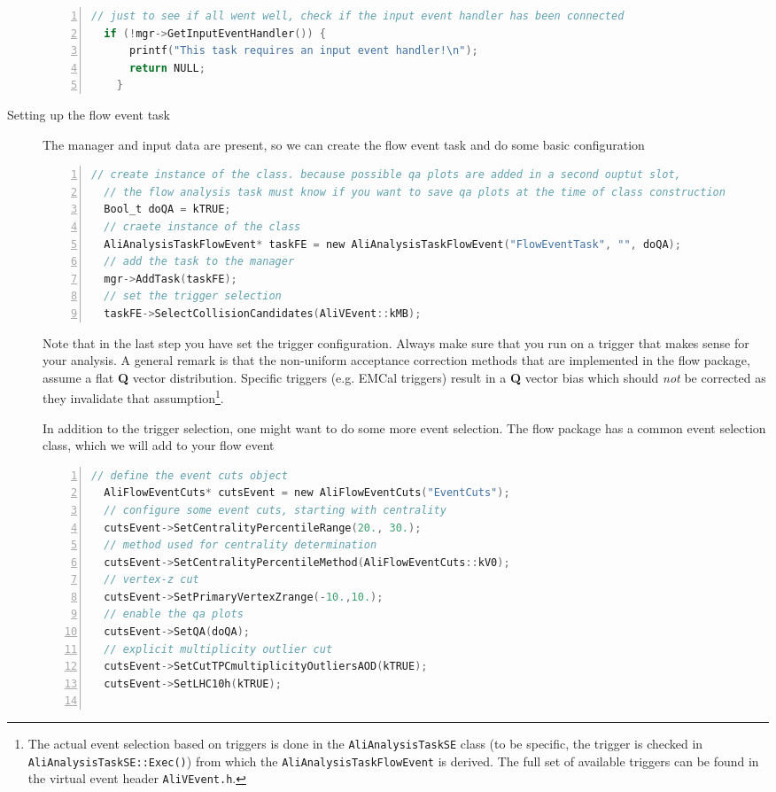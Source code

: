 \documentclass[a4paper]{book}
\numberwithin{equation}{subsection}
\begin{document}
\begin{description}
\begin{lstlisting}[language=C, numbers=left]
  // just to see if all went well, check if the input event handler has been connected
  if (!mgr->GetInputEventHandler()) {
      printf("This task requires an input event handler!\n");
      return NULL;
    }\end{lstlisting}
    \item [Setting up the flow event task]
The manager and input data are present, so we can create the flow event task and do some basic configuration
\begin{lstlisting}[language=C, numbers=left]
  // create instance of the class. because possible qa plots are added in a second ouptut slot,
  // the flow analysis task must know if you want to save qa plots at the time of class construction
  Bool_t doQA = kTRUE;
  // craete instance of the class
  AliAnalysisTaskFlowEvent* taskFE = new AliAnalysisTaskFlowEvent("FlowEventTask", "", doQA);
  // add the task to the manager
  mgr->AddTask(taskFE);
  // set the trigger selection
  taskFE->SelectCollisionCandidates(AliVEvent::kMB);\end{lstlisting}
Note that in the last step you have set the trigger configuration. Always make sure that you run on a trigger that makes sense for your analysis. A general remark is that the non-uniform acceptance correction methods that are implemented in the flow package, assume a flat \textbf{Q} vector distribution. Specific triggers (e.g. EMCal triggers) result in a \textbf{Q} vector bias which should \emph{not} be corrected as they invalidate that assumption\footnote{The actual event selection based on triggers is done in the \texttt{AliAnalysisTaskSE} class (to be specific, the trigger is checked in \texttt{AliAnalysisTaskSE::Exec()}) from which the \texttt{AliAnalysisTaskFlowEvent} is derived. The full set of available triggers can be found in the virtual event header \texttt{AliVEvent.h}. }.

In addition to the trigger selection, one might want to do some more event selection. The flow package has a common event selection class, which we will add to your flow event

\begin{lstlisting}[language=C, numbers=left]
  // define the event cuts object
  AliFlowEventCuts* cutsEvent = new AliFlowEventCuts("EventCuts");
  // configure some event cuts, starting with centrality
  cutsEvent->SetCentralityPercentileRange(20., 30.);
  // method used for centrality determination
  cutsEvent->SetCentralityPercentileMethod(AliFlowEventCuts::kV0);
  // vertex-z cut
  cutsEvent->SetPrimaryVertexZrange(-10.,10.);
  // enable the qa plots
  cutsEvent->SetQA(doQA);
  // explicit multiplicity outlier cut
  cutsEvent->SetCutTPCmultiplicityOutliersAOD(kTRUE);
  cutsEvent->SetLHC10h(kTRUE);
  

\end{lstlisting}
\end{description}
\end{document}

